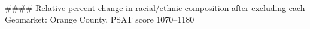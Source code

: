 #### Relative percent change in racial/ethnic composition after excluding each Geomarket: Orange County, PSAT score 1070–1180
